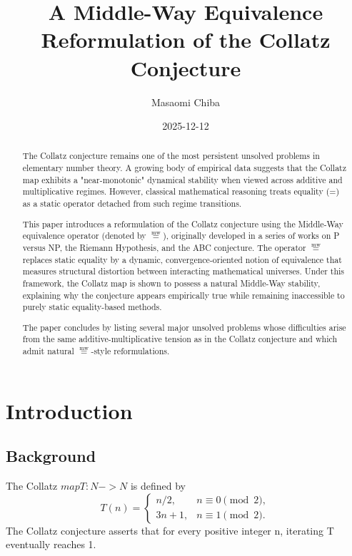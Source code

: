 \documentclass[11pt]{article}
\title{A Middle-Way Equivalence Reformulation of the Collatz Conjecture}
\author{Masaomi Chiba}
\date{2025-12-12}
\newcommand{\mweq}{\mathrel{\overset{\mathrm{mw}}{=}}}
\theoremstyle{definition}
\theoremstyle{remark}
\begin{document}
\maketitle

\begin{abstract}
The Collatz conjecture remains one of the most persistent unsolved
problems in elementary number theory. A growing body of empirical data
suggests that the Collatz map exhibits a "near-monotonic" dynamical
stability when viewed across additive and multiplicative regimes.
However, classical mathematical reasoning treats equality (=) as a
static operator detached from such regime transitions.

This paper introduces a reformulation of the Collatz conjecture using
the Middle-Way equivalence operator (denoted by $\mweq$), originally
developed in a series of works on P versus NP, the Riemann Hypothesis,
and the ABC conjecture. The operator $\mweq$ replaces static equality by a
dynamic, convergence-oriented notion of equivalence that measures
structural distortion between interacting mathematical universes.
Under this framework, the Collatz map is shown to possess a natural
Middle-Way stability, explaining why the conjecture appears empirically
true while remaining inaccessible to purely static equality-based
methods.

The paper concludes by listing several major unsolved problems whose
difficulties arise from the same additive-multiplicative tension as in
the Collatz conjecture and which admit natural $\mweq$-style
reformulations.
\end{abstract}

\section{Introduction}

\subsection{Background}

The Collatz $map T: N -> N$ is defined by
\[
  T(n) = 
  \begin{cases}
     n/2, & n \equiv 0 \pmod 2, \\
     3n+1, & n \equiv 1 \pmod 2.
  \end{cases}
\]
The Collatz conjecture asserts that for every positive integer n,
iterating T eventually reaches 1.
\end{document}
